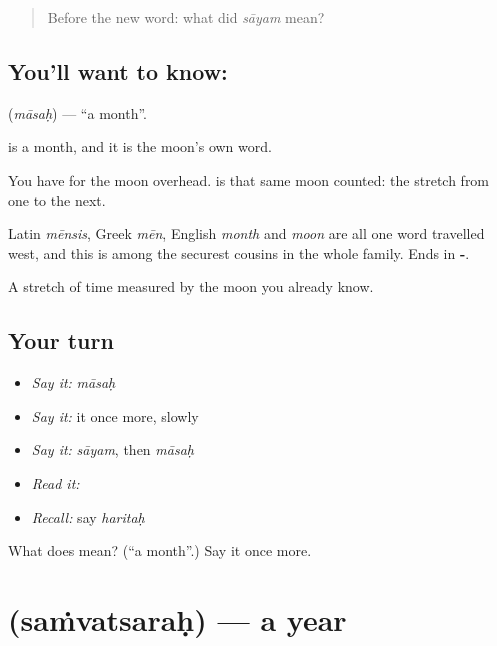 \label{lesson:SA-C45-month}



\begin{quote}
Before the new word: what did \emph{sāyam} mean?
\end{quote}

\subsection*{You'll want to know: }
\textbf{} (\emph{māsaḥ}) — \textquotedblleft{}a month\textquotedblright{}.

\textbf{} is a month, and it is the moon's own word.

You have  for the moon overhead. \textbf{} is that same moon counted: the stretch from one to the next.

Latin \emph{mēnsis}, Greek \emph{mēn}, English \emph{month} and \emph{moon} are all one word travelled west, and this is among the securest cousins in the whole family. Ends in \textbf{-}.

\begin{grammarlens}[title={What you've built}]
A stretch of time measured by the moon you already know.
\end{grammarlens}

\subsection*{Your turn}
\begin{itemize}
\raggedright
  \item \emph{Say it:} \emph{māsaḥ}
  \item \emph{Say it:} it once more, slowly
  \item \emph{Say it:} \emph{sāyam}, then \emph{māsaḥ}
  \item \emph{Read it:} \textbf{}
  \item \emph{Recall:} say \emph{haritaḥ}
\end{itemize}

\begin{tcolorbox}[breakable,colback=teal!4,colframe=teal!35!black,title={Before you move on}]
What does  mean? (\textquotedblleft{}a month\textquotedblright{}.) Say it once more.
\end{tcolorbox}
\section[\texorpdfstring{\sk{संवत्सरः} (saṁvatsaraḥ)}{संवत्सरः (saṁvatsaraḥ)}]{ (saṁvatsaraḥ) — a year}

